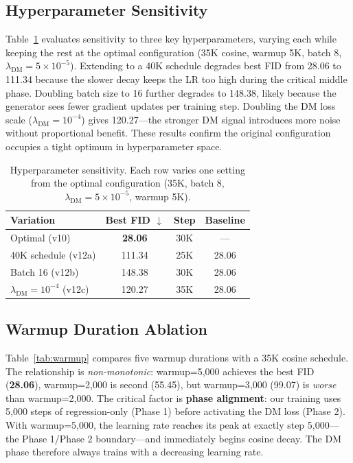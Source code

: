 \documentclass{article}
\theoremstyle{plain}
\theoremstyle{remark}
\begin{document}
\subsection{Hyperparameter Sensitivity}
\label{sec:sensitivity}

Table~\ref{tab:sensitivity} evaluates sensitivity to three key hyperparameters, varying each while keeping the rest at the optimal configuration (35K cosine, warmup 5K, batch 8, $\lambda_{\text{DM}} = 5 \times 10^{-5}$). Extending to a 40K schedule degrades best FID from 28.06 to 111.34 because the slower decay keeps the LR too high during the critical middle phase. Doubling batch size to 16 further degrades to 148.38, likely because the generator sees fewer gradient updates per training step. Doubling the DM loss scale ($\lambda_{\text{DM}} = 10^{-4}$) gives 120.27---the stronger DM signal introduces more noise without proportional benefit. These results confirm the original configuration occupies a tight optimum in hyperparameter space.

\begin{table}[t]
\caption{Hyperparameter sensitivity. Each row varies one setting from the optimal configuration (35K, batch 8, $\lambda_{\text{DM}} = 5{\times}10^{-5}$, warmup 5K).}
\label{tab:sensitivity}
\centering
\small
\begin{tabular}{lccc}
\toprule
Variation & Best FID $\downarrow$ & Step & Baseline \\
\midrule
Optimal (v10) & \textbf{28.06} & 30K & --- \\
40K schedule (v12a) & 111.34 & 25K & 28.06 \\
Batch 16 (v12b) & 148.38 & 30K & 28.06 \\
$\lambda_{\text{DM}} = 10^{-4}$ (v12c) & 120.27 & 35K & 28.06 \\
\bottomrule
\end{tabular}
\end{table}

\subsection{Warmup Duration Ablation}
\label{sec:warmup}

Table~\ref{tab:warmup} compares five warmup durations with a 35K cosine schedule. The relationship is \emph{non-monotonic}: warmup=5,000 achieves the best FID (\textbf{28.06}), warmup=2,000 is second (55.45), but warmup=3,000 (99.07) is \emph{worse} than warmup=2,000. The critical factor is \textbf{phase alignment}: our training uses 5,000 steps of regression-only (Phase 1) before activating the DM loss (Phase 2). With warmup=5,000, the learning rate reaches its peak at exactly step 5,000---the Phase 1/Phase 2 boundary---and immediately begins cosine decay. The DM phase therefore always trains with a decreasing learning rate.
\end{document}
